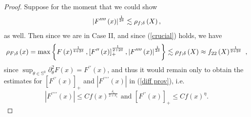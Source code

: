 \documentclass{amsart}
\theoremstyle{plain}
\numberwithin{equation}{section}
\begin{document}
\begin{proof}
Suppose for the moment that we could show 
\begin{equation}
\left\vert F^{\prime \prime \prime \prime }\left( x\right) \right\vert ^{%
\frac{1}{2\delta }}\lesssim \rho _{f;\delta }\left( X\right) ,
\label{can show}
\end{equation}%
as well. Then since we are in Case II, and since (\ref{crucial}) holds, we
have%
\begin{equation*}
\rho _{F;\delta }\left( x\right) =\max \left\{ F\left( x\right) ^{\frac{1}{%
4+2\delta }},\left[ F^{\prime \prime }\left( x\right) \right] _{+}^{\frac{1}{%
2+2\delta }},\left\vert F^{\prime \prime \prime \prime }\left( x\right)
\right\vert ^{\frac{1}{2\delta }}\right\} \lesssim \rho _{f;\delta }\left(
X\right) \approx f_{22}\left( X\right) ^{\frac{1}{2+2\delta }}\ ,
\end{equation*}%
since $\sup_{\theta \in \mathbb{S}^{0}}\partial _{\theta }^{2}F\left(
x\right) =F^{\prime \prime }\left( x\right) $, and thus it would remain only
to obtain the estimates for $\left[ F^{\prime \prime }\left( x\right) \right]
_{+}$ and $\left\vert F^{\prime \prime \prime \prime }\left( x\right)
\right\vert $ in (\ref{diff prov}), i.e.%
\begin{equation*}
\left\vert F^{\prime \prime \prime \prime }\left( x\right) \right\vert \leq
Cf\left( x\right) ^{\frac{\delta _{1}}{2+\delta _{1}}}\text{ and }\left[
F^{\prime \prime }\left( x\right) \right] _{+}\leq Cf\left( x\right) ^{\eta
}.
\end{equation*}


\end{proof}
\end{document}
